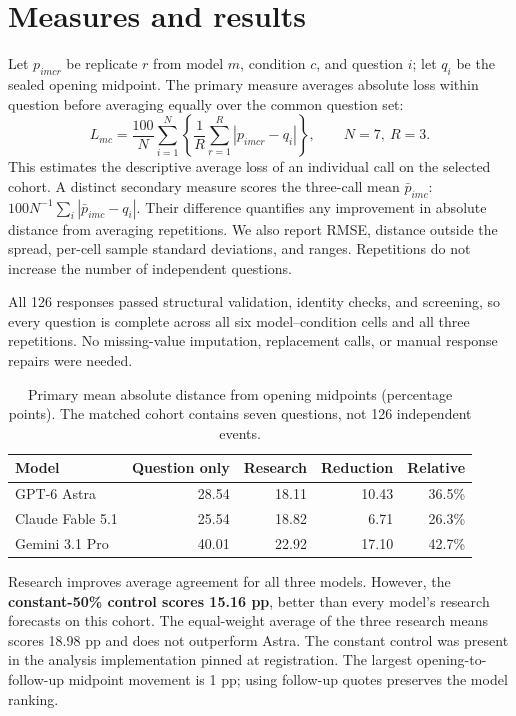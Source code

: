 \documentclass[11pt]{article}
\begin{document}
\section{Measures and results}
Let $p_{imcr}$ be replicate $r$ from model $m$, condition $c$, and question $i$;
let $q_i$ be the sealed opening midpoint. The primary measure averages absolute
loss within question before averaging equally over the common question set:
\[
 L_{mc}=\frac{100}{N}\sum_{i=1}^{N}\left\{\frac{1}{R}\sum_{r=1}^{R}
 |p_{imcr}-q_i|\right\},\qquad N=7,\ R=3.
\]
This estimates the descriptive average loss of an individual call on the
selected cohort. A distinct secondary measure scores the three-call mean
$\bar p_{imc}$: $100N^{-1}\sum_i|\bar p_{imc}-q_i|$. Their difference quantifies
any improvement in absolute distance from averaging repetitions. We also
report RMSE, distance outside the spread, per-cell sample standard deviations,
and ranges. Repetitions do not increase the number of independent questions.

All 126 responses passed structural validation, identity checks, and screening,
so every question is complete across all six model--condition cells and all
three repetitions. No missing-value imputation, replacement calls, or manual
response repairs were needed.

\begin{table}[htbp]\centering
\caption{Primary mean absolute distance from opening midpoints (percentage points). The matched cohort contains seven questions, not 126 independent events.}
\begin{tabular}{lrrrr}\toprule
Model & Question only & Research & Reduction & Relative\\\midrule
GPT-6 Astra & 28.54 & 18.11 & 10.43 & 36.5\%\\
Claude Fable 5.1 & 25.54 & 18.82 & 6.71 & 26.3\%\\
Gemini 3.1 Pro & 40.01 & 22.92 & 17.10 & 42.7\%\\
\bottomrule\end{tabular}
\end{table}

Research improves average agreement for all three models. However, the
\textbf{constant-50\% control scores 15.16 pp}, better than every model's
research forecasts on this cohort. The equal-weight average of the three
research means scores 18.98 pp and does not outperform Astra.
The constant control was present in the analysis implementation pinned at
registration. The largest opening-to-follow-up midpoint movement is 1 pp;
using follow-up quotes preserves the model ranking.
\end{document}
